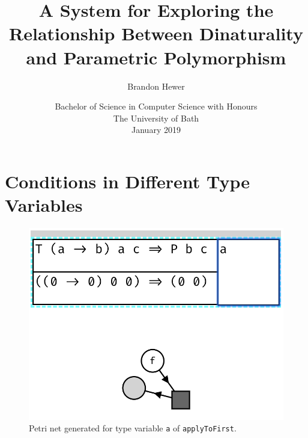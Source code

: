 \documentclass[11pt,openright,hidelinks,a4paper]{article}
\title{A System for Exploring the Relationship Between Dinaturality and Parametric Polymorphism}
\author{Brandon Hewer}
\date{Bachelor of Science in Computer Science with Honours\\The University of Bath\\January 2019}
\begin{document}
\setcounter{page}{0}

\maketitle

\newpage

\tableofcontents
\newpage

\setcounter{page}{1}


\newpage

\newpage

\newpage

\newpage

\newpage

\newpage

\newpage


\newpage



\newpage

\appendix

\section{Conditions in Different Type Variables}\label{app:differentvars}

\begin{figure}[H]
\begin{center}
\includegraphics[scale=0.45]{applytofirsta}
\end{center}
\caption{Petri net generated for type variable \lstinline{a} of \lstinline{applyToFirst}.}
\label{fig:applyToFirstA}
\end{figure}
\end{document}
